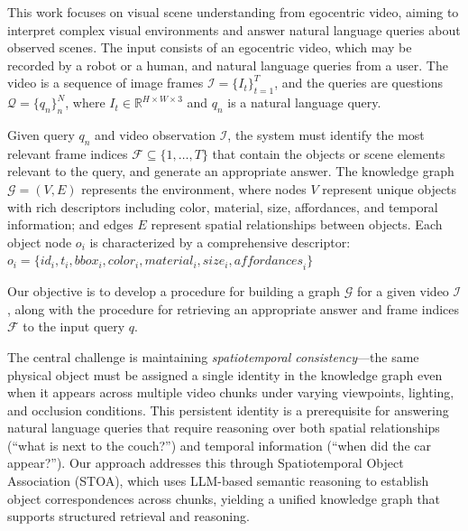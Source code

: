 This work focuses on visual scene understanding from egocentric video, aiming to interpret complex visual environments and answer natural language queries about observed scenes.
The input consists of an egocentric video, which may be recorded by a robot or a human, and natural language queries from a user. The video is a sequence of image frames $\mathcal{I} = \{I_t\}_{t=1}^T$, and the queries are questions $\mathcal{Q} = \{ q_n \}_{n}^{N}$, where $I_t \in \mathbb{R}^{H \times W \times 3}$ and $q_n$ is a natural language query.

Given query $q_n$ and video observation $\mathcal{I}$, the system must identify the most relevant frame indices $\mathcal{F} \subseteq \{1, \ldots, T\}$ that contain the objects or scene elements relevant to the query, and generate an appropriate answer.
The knowledge graph $\mathcal{G} = (V, E)$ represents the environment, where nodes $V$ represent unique objects with rich descriptors including color, material, size, affordances, and temporal information; and edges $E$ represent spatial relationships between objects.
Each object node $o_i$ is characterized by a comprehensive descriptor:
$o_i = \{\textit{id}_i, 
\textit{t}_i,
\textit{bbox}_i,
\textit{color}_i, \textit{material}_i, \textit{size}_i,  \textit{affordances}_i\}$


Our objective is to develop a procedure for building a graph $\mathcal{G}$ for a given video $\mathcal{I}$, along with the procedure for retrieving an appropriate answer and frame indices $\mathcal{F}$ to the input query $q$.

The central challenge is maintaining \textit{spatiotemporal consistency}---the same physical object must be assigned a single identity in the knowledge graph even when it appears across multiple video chunks under varying viewpoints, lighting, and occlusion conditions. This persistent identity is a prerequisite for answering natural language queries that require reasoning over both spatial relationships (``what is next to the couch?'') and temporal information (``when did the car appear?'').
Our approach addresses this through Spatiotemporal Object Association (STOA), which uses LLM-based semantic reasoning to establish object correspondences across chunks, yielding a unified knowledge graph that supports structured retrieval and reasoning.
